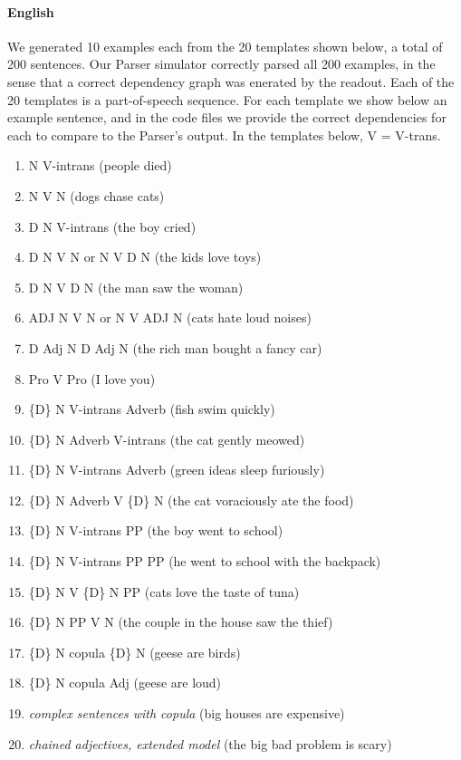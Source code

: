 \documentclass[11pt,a4paper]{article}
\begin{document}
\paragraph{English} We generated 10 examples each from the 20 templates shown below, a total of 200 sentences. Our Parser simulator correctly parsed all 200 examples, in the sense that a correct dependency graph was enerated by the readout.  Each of the 20 templates is a part-of-speech sequence. For each template we show below an example sentence, and in the code files we provide the correct dependencies for each to compare to the Parser's output. In the templates below, {\sc V} = {\sc V-trans}.
\begin{enumerate}[noitemsep] 
\item {\sc N V-intrans} (people died)
\item {\sc N V N} (dogs chase cats)
\item {\sc D N V-intrans} (the boy cried)
\item {\sc D N V N} or {\sc N V D N} (the kids love toys)
\item {\sc D N V D N} (the man saw the woman)
\item {\sc ADJ N V N} or {\sc N V ADJ N} (cats hate loud noises)
\item {\sc D Adj N D Adj N} (the rich man bought a fancy car)
\item {\sc Pro V Pro} (I love you)
\item {\sc \{D\} N V-intrans Adverb} (fish swim quickly)
\item {\sc \{D\} N Adverb V-intrans} (the cat gently meowed)
\item {\sc \{D\} N V-intrans Adverb} (green ideas sleep furiously)
\item {\sc  \{D\} N Adverb V \{D\} N} (the cat voraciously ate the food)
\item {\sc   \{D\} N V-intrans PP} (the boy went to school)
\item {\sc   \{D\} N V-intrans PP PP} (he went to school with the backpack)
\item {\sc  \{D\} N V \{D\} N PP  } (cats love the taste of tuna)
\item {\sc  \{D\} N PP V N} (the couple in the house saw the thief)
\item {\sc  \{D\} N copula  \{D\} N} (geese are birds)
\item {\sc  \{D\} N copula Adj} (geese are loud)
\item {\em complex sentences with copula} (big houses are expensive)
\item {\em chained adjectives, extended model} (the big bad problem is scary)
\end{enumerate}
\end{document}

